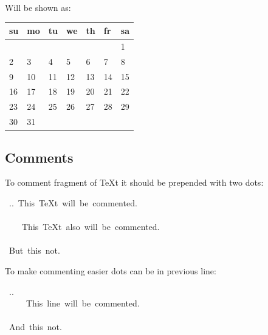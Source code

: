 \documentclass[12pt]{article}
\begin{document}
Will be shown as:

\setlongtables
\begin{center}
\begin{longtable}[c]{|p{}|p{}|p{}|p{}|p{}|p{}|p{}|}\hline

su
&
mo
&
tu
&
we
&
th
&
fr
&
sa

 \\ \hline
\endhead
&
&
&
&
&

&
1
\\ \hline
2
&
3
&
4
&
5
&
6
&
7
&
8
\\ \hline
9
&
10
&
11
&
12
&
13
&
14
&
15
\\ \hline
16
&
17
&
18
&
19
&
20
&
21
&
22
\\ \hline
23
&
24
&
25
&
26
&
27
&
28
&
29
\\ \hline
30
&
31
&
&
&
&
&
\\ \hline
\end{longtable}
\end{center}

\hypertarget{lcomment}{}

\hypertarget{lcomments}{}
\subsection{Comments}

To comment fragment of \TeX{}t it should be prepended with two dots:

\begin{ttfamily}\begin{flushleft}
\mbox{~..~This~\TeX{}t~will~be~commented.}\\
\mbox{}\\
\mbox{~~~~This~\TeX{}t~also~will~be~commented.}\\
\mbox{}\\
\mbox{~But~this~not.}\\
\end{flushleft}\end{ttfamily}

To make commenting easier dots can be in previous line:

\begin{ttfamily}\begin{flushleft}
\mbox{~..}\\
\mbox{~~~~~This~line~will~be~commented.}\\
\mbox{}\\
\mbox{~And~this~not.}\\
\end{flushleft}\end{ttfamily}
\end{document}
